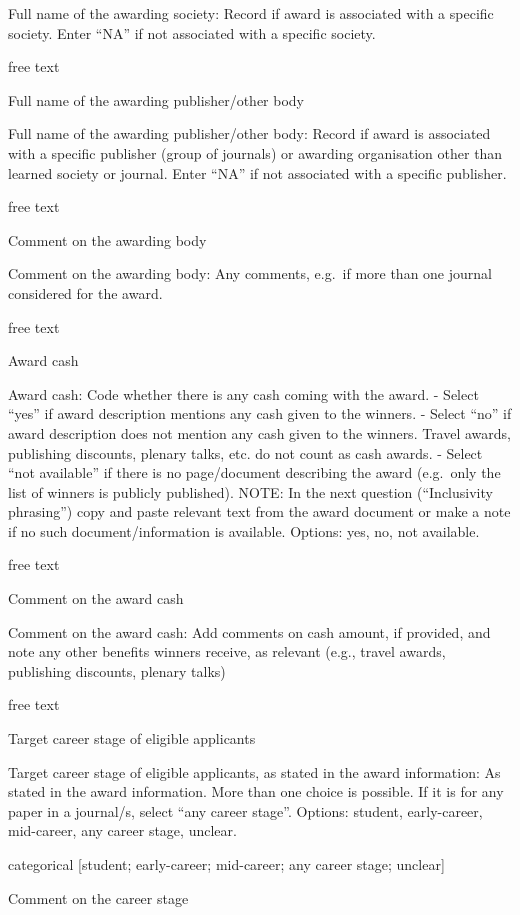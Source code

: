 \documentclass[
]{article}
\begin{document}
Full name of the awarding society: Record if award is associated with a
specific society. Enter ``NA'' if not associated with a specific
society.

free text

Full name of the awarding publisher/other body

Full name of the awarding publisher/other body: Record if award is
associated with a specific publisher (group of journals) or awarding
organisation other than learned society or journal. Enter ``NA'' if not
associated with a specific publisher.

free text

Comment on the awarding body

Comment on the awarding body: Any comments, e.g.~if more than one
journal considered for the award.

free text

Award cash

Award cash: Code whether there is any cash coming with the award. -
Select ``yes'' if award description mentions any cash given to the
winners. - Select ``no'' if award description does not mention any cash
given to the winners. Travel awards, publishing discounts, plenary
talks, etc. do not count as cash awards. - Select ``not available'' if
there is no page/document describing the award (e.g.~only the list of
winners is publicly published). NOTE: In the next question
(``Inclusivity phrasing'') copy and paste relevant text from the award
document or make a note if no such document/information is available.
Options: yes, no, not available.

free text

Comment on the award cash

Comment on the award cash: Add comments on cash amount, if provided, and
note any other benefits winners receive, as relevant (e.g., travel
awards, publishing discounts, plenary talks)

free text

Target career stage of eligible applicants

Target career stage of eligible applicants, as stated in the award
information: As stated in the award information. More than one choice is
possible. If it is for any paper in a journal/s, select ``any career
stage''. Options: student, early-career, mid-career, any career stage,
unclear.

categorical {[}student; early-career; mid-career; any career stage;
unclear{]}

Comment on the career stage
\end{document}
